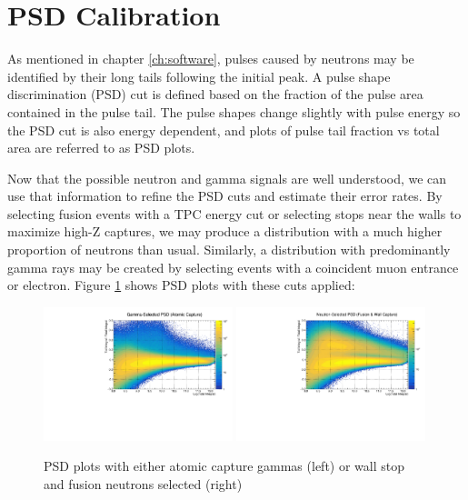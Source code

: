\section{PSD Calibration}

As mentioned in chapter \ref{ch:software}, pulses caused by neutrons may be identified by their long tails following the initial peak.
A pulse shape discrimination (PSD) cut is defined based on the fraction of the pulse area contained in the pulse tail.
The pulse shapes change slightly with pulse energy so the PSD cut is also energy dependent, and plots of pulse tail fraction vs total area are referred to as PSD plots.

Now that the possible neutron and gamma signals are well understood, we can use that information to refine the PSD cuts and estimate their error rates.
By selecting fusion events with a TPC energy cut or selecting stops near the walls to maximize high-Z captures, we may produce a distribution with a much higher proportion of neutrons than usual.  
Similarly, a distribution with predominantly gamma rays may be created by selecting events with a coincident muon entrance or electron.
Figure \ref{fig:psd_selection} shows PSD plots with these cuts applied:

\begin{figure}[h]
  \includegraphics[width=0.49\textwidth]{neutrons/figures/PSD_gammma_atomic.pdf}
  \includegraphics[width=0.49\textwidth]{neutrons/figures/PSD_neu_fusion_wall.pdf}
  \caption{PSD plots with either atomic capture gammas (left) or wall stop and fusion neutrons selected (right)}
  \label{fig:psd_selection}
\end{figure}

